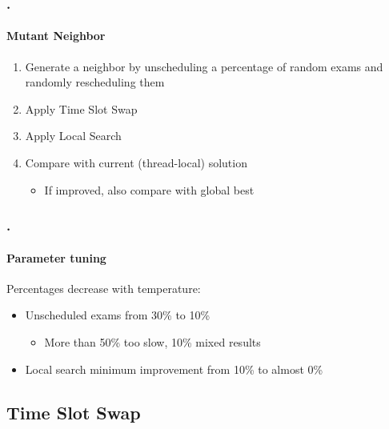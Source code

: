 \documentclass{beamer}
\begin{document}
\begin{frame}
\frametitle{\thesection.\thesubsection \ \insertsubsection}
\framesubtitle{Mutant Neighbor}
\begin{enumerate}
	\item Generate a neighbor by \alert{unscheduling a percentage of random exams} and randomly rescheduling them
	\item Apply Time Slot Swap
	\item Apply Local Search
	\item Compare with current (thread-local) solution
	\begin{itemize}
			\item If improved, also compare with \alert{global best}
	\end{itemize}

\end{enumerate}
\end{frame}

\begin{frame}
\frametitle{\thesection.\thesubsection \ \insertsubsection}
\framesubtitle{Parameter tuning}
	Percentages decrease with temperature:
\begin{itemize}

	\item Unscheduled exams from 30\% to 10\%
	\begin{itemize}
		\item More than 50\% too slow, 10\% mixed results %
	\end{itemize}
	\item Local search minimum improvement from 10\% to almost 0\%
\end{itemize}
\end{frame}

\subsection{Time Slot Swap}
\end{document}
